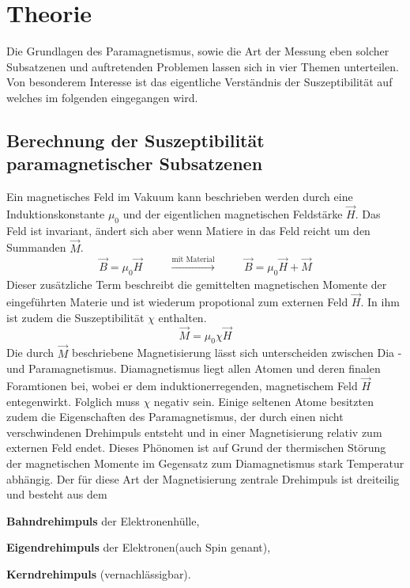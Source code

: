 \section{Theorie}
Die Grundlagen des Paramagnetismus, sowie die Art der Messung eben solcher Subsatzenen und auftretenden Problemen 
lassen sich in vier Themen unterteilen. Von besonderem Interesse ist das eigentliche Verständnis der Suszeptibilität 
auf welches im folgenden eingegangen wird.

\subsection{Berechnung der Suszeptibilität paramagnetischer Subsatzenen}
Ein magnetisches Feld im Vakuum kann beschrieben werden durch eine Induktionskonstante $\mu_0$ und der eigentlichen magnetischen Feldstärke
$\vec{H}$. Das Feld ist invariant, ändert sich aber wenn Matiere in das Feld reicht um den Summanden $\vec{M}$. 
\begin{equation}
    \vec{B}=\mu_0 \vec{H} \hspace{1cm} \xrightarrow[]{\text{mit Material}} \hspace{1cm} \vec{B}=\mu_0 \vec{H} + \vec{M}
\end{equation}
Dieser zusätzliche Term beschreibt die gemittelten magnetischen Momente der eingeführten Materie und ist wiederum propotional zum externen Feld $\vec{H}$. 
In ihm ist zudem die Suszeptibilität $\chi$ enthalten.
\begin{equation}
    \vec{M} = \mu_0 \chi \vec{H}
\end{equation}
Die durch $\vec{M}$ beschriebene Magnetisierung lässt sich unterscheiden zwischen Dia - und Paramagnetismus. 
Diamagnetismus liegt allen Atomen und deren finalen Foramtionen bei, wobei er dem induktionerregenden, magnetischem Feld $\vec{H}$
entegenwirkt. Folglich muss $\chi$ negativ sein.
Einige seltenen Atome besitzten zudem die Eigenschaften des Paramagnetismus, der durch einen nicht verschwindenen Drehimpuls entsteht und in einer 
Magnetisierung relativ zum externen Feld endet.
Dieses Phönomen ist auf Grund der thermischen Störung der magnetischen Momente im Gegensatz zum Diamagnetismus stark Temperatur abhängig.
Der für diese Art der Magnetisierung zentrale Drehimpuls ist dreiteilig und besteht aus dem
\begin{description}
    \item \textbf{Bahndrehimpuls} der Elektronenhülle,\\
    \item \textbf{Eigendrehimpuls} der Elektronen(auch Spin genant), \\
    \item \textbf{Kerndrehimpuls} (vernachlässigbar).
\end{description}
